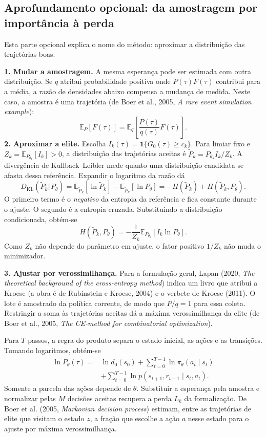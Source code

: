 \documentclass[12pt]{article}
\begin{document}
\subsection{Aprofundamento opcional: da amostragem por importância à perda}

Esta parte opcional explica o nome do método: aproximar a distribuição das trajetórias boas.

\textbf{1. Mudar a amostragem.} A mesma esperança pode ser estimada com outra distribuição. Se $q$ atribui probabilidade positiva onde $P(\tau)F(\tau)$ contribui para a média, a razão de densidades abaixo compensa a mudança de medida. Neste caso, a amostra é uma trajetória (de Boer et al., 2005, \emph{A rare event simulation example}):
\[
 \mathbb E_P[F(\tau)]=\mathbb E_q\!\left[\frac{P(\tau)}{q(\tau)}F(\tau)\right].
\]
\textbf{2. Aproximar a elite.} Escolha $I_k(\tau)=\mathbf 1\{G_0(\tau)\geq c_k\}$. Para limiar fixo e $Z_k=\mathbb E_{P_{\theta_k}}[I_k]>0$, a distribuição das trajetórias aceitas é $\widetilde P_k=P_{\theta_k}I_k/Z_k$. A divergência de Kullback--Leibler mede quanto uma distribuição candidata se afasta dessa referência. Expandir o logaritmo da razão dá
\[
 D_{\mathrm{KL}}(\widetilde P_k\Vert P_\theta)
 =\mathbb E_{\widetilde P_k}[\ln\widetilde P_k]-\mathbb E_{\widetilde P_k}[\ln P_\theta]
 =-H(\widetilde P_k)+H(\widetilde P_k,P_\theta).
\]
O primeiro termo é o \emph{negativo} da entropia da referência e fica constante durante o ajuste. O segundo é a entropia cruzada. Substituindo a distribuição condicionada, obtém-se
\[
 H(\widetilde P_k,P_\theta)=-\frac1{Z_k}\mathbb E_{P_{\theta_k}}[I_k\ln P_\theta].
\]
Como $Z_k$ não depende do parâmetro em ajuste, o fator positivo $1/Z_k$ não muda o minimizador.

\textbf{3. Ajustar por verossimilhança.} Para a formulação geral, Lapan (2020, \emph{The theoretical background of the cross-entropy method}) indica um livro que atribui a Kroese (a obra é de Rubinstein e Kroese, 2004) e o verbete de Kroese (2011). O lote é amostrado da política corrente, de modo que $P/q=1$ para essa coleta. Restringir a soma às trajetórias aceitas dá a máxima verossimilhança da elite (de Boer et al., 2005, \emph{The CE-method for combinatorial optimization}).

Para $T$ passos, a regra do produto separa o estado inicial, as ações e as transições. Tomando logaritmos, obtém-se
\[
\begin{aligned}
 \ln P_\theta(\tau)={}&\ln d_0(s_0)+\sum_{t=0}^{T-1}\ln\pi_\theta(a_t\mid s_t)\\
 &+\sum_{t=0}^{T-1}\ln p(s_{t+1},r_{t+1}\mid s_t,a_t).
\end{aligned}
\]
Somente a parcela das ações depende de $\theta$. Substituir a esperança pela amostra e normalizar pelas $M$ decisões aceitas recupera a perda $L_k$ da formalização. De Boer et al. (2005, \emph{Markovian decision process}) estimam, entre as trajetórias de elite que visitam o estado $z$, a fração que escolhe a ação $a$ nesse estado para o ajuste por máxima verossimilhança.
\end{document}
